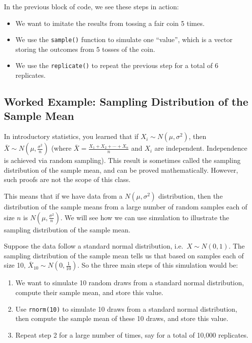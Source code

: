 \documentclass[
]{book}
\providecommand{\tightlist}{%
  \setlength{\itemsep}{0pt}\setlength{\parskip}{0pt}}
\theoremstyle{definition}
\theoremstyle{definition}
\theoremstyle{definition}
\theoremstyle{definition}
\theoremstyle{remark}
\begin{document}
In the previous block of code, we see these steps in action:

\begin{itemize}
\tightlist
\item
  We want to imitate the results from tossing a fair coin 5 times.
\item
  We use the \texttt{sample()} function to simulate one ``value'', which is a vector storing the outcomes from 5 tosses of the coin.
\item
  We use the \texttt{replicate()} to repeat the previous step for a total of 6 replicates.
\end{itemize}

\hypertarget{ch6sim}{%
\subsection{Worked Example: Sampling Distribution of the Sample Mean}\label{ch6sim}}

In introductory statistics, you learned that if \(X_i \sim N(\mu, \sigma^2)\), then \(\bar{X} \sim N(\mu, \frac{\sigma^2}{n})\) (where \(\bar{X} = \frac{X_1 + X_2 + \cdots + X_n}{n}\) and \(X_i\) are independent. Independence is achieved via random sampling). This result is sometimes called the sampling distribution of the sample mean, and can be proved mathematically. However, such proofs are not the scope of this class.

This means that if we have data from a \(N(\mu, \sigma^2)\) distribution, then the distribution of the sample means from a large number of random samples each of size \(n\) is \(N(\mu, \frac{\sigma^2}{n})\). We will see how we can use simulation to illustrate the sampling distribution of the sample mean.

Suppose the data follow a standard normal distribution, i.e.~\(X \sim N(0,1)\). The sampling distribution of the sample mean tells us that based on samples each of size 10, \(\bar{X}_{10} \sim N(0, \frac{1}{10})\). So the three main steps of this simulation would be:

\begin{enumerate}
\def\labelenumi{\arabic{enumi}.}
\tightlist
\item
  We want to simulate 10 random draws from a standard normal distribution, compute their sample mean, and store this value.
\item
  Use \texttt{rnorm(10)} to simulate 10 draws from a standard normal distribution, then compute the sample mean of these 10 draws, and store this value.
\item
  Repeat step 2 for a large number of times, say for a total of 10,000 replicates.
\end{enumerate}
\end{document}
